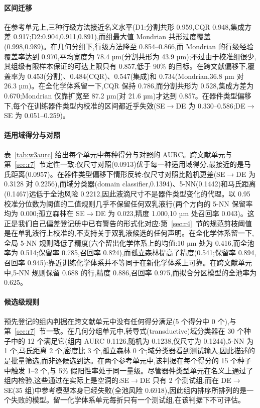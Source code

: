 \documentclass[11pt,a4paper]{ctexart}
\begin{document}
\paragraph{区间迁移} 在参考单元上,三种行级方法接近名义水平(D1:分割共形 0.959,CQR 0.948,集成方差 0.917;D2:0.904,0.911,0.891),而组最大值 Mondrian 共形过度覆盖(0.998,0.989)。在几何分组下,行级方法降至 0.854–0.866,而 Mondrian 的行级经验覆盖率达到 0.970,平均宽度为 78.4 µm(分割共形为 43.9 µm);不过由于校准组很少,其组级有限样本保证的可达上限只有 0.857,低于 90\% 的目标。在跨文献偏移下,覆盖率为 0.453(分割)、0.484(CQR)、0.547(集成)和 0.734(Mondrian,36.8 µm 对 26.3 µm)。在全化学体系留一下,CQR 保持 0.786,而分割共形为 0.528,集成方差为 0.670;Mondrian 仅靠扩宽至 87.2 µm(对 21.6 µm)才达到 0.857。在器件类型偏移下,每个在训练器件类型内校准的区间都近乎失效(SE$\to$DE 为 0.330–0.586;DE$\to$SE 为 0.051–0.259)。

\paragraph{适用域得分与对照} 表~\ref{tab:w3aurc} 给出每个单元中每种得分与对照的 AURC。跨文献单元与第~\ref{sec:r7}~节定性一致:仅尺寸对照(0.0913)优于每一种适用域得分,最接近的是马氏距离(0.0957)。在器件类型偏移下情形反转:仅尺寸对照比随机更差(SE$\to$DE 为 0.3128 对 0.2256),而域分类器(domain classifier,0.1394)、5-NN(0.1442)和马氏距离(0.1467)远低于全池风险 0.2212,因此液滴尺寸不是器件类型变化的代理。以 0.95 校准分位数为阈值的二值规则几乎不保留任何双乳液行(两个方向的 5-NN 保留率均为 0.000;孤立森林在 SE$\to$DE 为 0.023,精度 1.000,10 µm 处召回率 0.043)。这正是我们自己偏差登记册中已有警告的形式化对应:第~\ref{sec:r4}~节的规范剪枝阈值是在单乳液行上校准的,不支持关于双乳液候选的任何声明。在全化学体系留一下,全局 5-NN 规则降低了精度(六个留出化学体系上的均值:10 µm 处为 0.416,而全池率为 0.514;保留率 0.785,召回率 0.824),而孤立森林提高了精度(0.541;保留率 0.894,召回率 0.945):靠近训练化学体系并不等同于在新化学体系上可靠。在跨文献单元中,5-NN 规则保留 0.688 的行,精度 0.886,召回率 0.975,而拟合分区模型的全池率为 0.625。

\paragraph{候选级规则} 预先登记的组内判据在跨文献单元中没有任何得分满足(5 个得分中 0 个),与第~\ref{sec:r7}~节一致。在几何分组单元中,转导式(transductive)域分类器在 30 个种子中的 12 个满足它(组内 AURC 0.1126,随机为 0.1238,仅尺寸为 0.1244),5-NN 为 1 个,马氏距离 2 个,密度比 3 个,孤立森林 0 个;域分类器看到测试输入,因此描述的是批量筛选,而非逐候选到达。在两个参考单元中,该判据在每个得分的 15 个种子中触发 1–2 个,与 5\% 假阳性率处于同一量级。尽管器件类型单元在名义上通过了组内检验,这些通过在实际上是空洞的:SE$\to$DE 只有 2 个测试组,而在 DE$\to$SE(35 组)中参考模型本身已经失败(全池风险 0.6918),因此组内排序所排列的是一个失败的模型。留一化学体系单元每折只有一个测试组,在该判据下不可评估。
\end{document}
